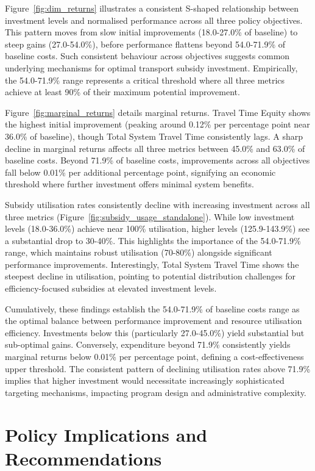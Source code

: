 \documentclass[a4paper,fleqn]{cas-sc}
\begin{document}
Figure~\ref{fig:dim_returns} illustrates a consistent S-shaped relationship between investment levels and normalised performance across all three policy objectives. This pattern moves from slow initial improvements (18.0-27.0\% of baseline) to steep gains (27.0-54.0\%), before performance flattens beyond 54.0-71.9\% of baseline costs. Such consistent behaviour across objectives suggests common underlying mechanisms for optimal transport subsidy investment. Empirically, the 54.0-71.9\% range represents a critical threshold where all three metrics achieve at least 90\% of their maximum potential improvement.

Figure~\ref{fig:marginal_returns} details marginal returns. Travel Time Equity shows the highest initial improvement (peaking around 0.12\% per percentage point near 36.0\% of baseline), though Total System Travel Time consistently lags. A sharp decline in marginal returns affects all three metrics between 45.0\% and 63.0\% of baseline costs. Beyond 71.9\% of baseline costs, improvements across all objectives fall below 0.01\% per additional percentage point, signifying an economic threshold where further investment offers minimal system benefits.

Subsidy utilisation rates consistently decline with increasing investment across all three metrics (Figure~\ref{fig:subsidy_usage_standalone}). While low investment levels (18.0-36.0\%) achieve near 100\% utilisation, higher levels (125.9-143.9\%) see a substantial drop to 30-40\%. This highlights the importance of the 54.0-71.9\% range, which maintains robust utilisation (70-80\%) alongside significant performance improvements. Interestingly, Total System Travel Time shows the steepest decline in utilisation, pointing to potential distribution challenges for efficiency-focused subsidies at elevated investment levels.

Cumulatively, these findings establish the 54.0-71.9\% of baseline costs range as the optimal balance between performance improvement and resource utilisation efficiency. Investments below this (particularly 27.0-45.0\%) yield substantial but sub-optimal gains. Conversely, expenditure beyond 71.9\% consistently yields marginal returns below 0.01\% per percentage point, defining a cost-effectiveness upper threshold. The consistent pattern of declining utilisation rates above 71.9\% implies that higher investment would necessitate increasingly sophisticated targeting mechanisms, impacting program design and administrative complexity.

\section{Policy Implications and Recommendations}\label{sec:implications}
\end{document}
